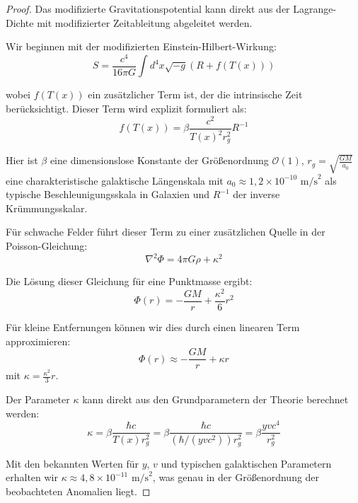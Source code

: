 \documentclass{article}
\theoremstyle{definition}
\theoremstyle{remark}
\newcommand{\Tfield}{T(x)} %
\begin{document}
		\begin{proof}
			Das modifizierte Gravitationspotential kann direkt aus der Lagrange-Dichte mit modifizierter Zeitableitung abgeleitet werden.
			
			Wir beginnen mit der modifizierten Einstein-Hilbert-Wirkung:
			\begin{equation}
				S = \frac{c^4}{16\pi G}\int d^4x \sqrt{-g} \left(R + f(\Tfield) \right)
			\end{equation}
			
			wobei $f(\Tfield)$ ein zusätzlicher Term ist, der die intrinsische Zeit berücksichtigt. Dieser Term wird explizit formuliert als:
			\begin{equation}
				f(\Tfield) = \beta \frac{c^2}{\Tfield^2 r_g^2} R^{-1}
			\end{equation}
			
			Hier ist $\beta$ eine dimensionslose Konstante der Größenordnung $\mathcal{O}(1)$, $r_g = \sqrt{\frac{GM}{a_0}}$ eine charakteristische galaktische Längenskala mit $a_0 \approx 1,2 \times 10^{-10} \text{ m/s}^2$ als typische Beschleunigungsskala in Galaxien und $R^{-1}$ der inverse Krümmungsskalar.
			
			Für schwache Felder führt dieser Term zu einer zusätzlichen Quelle in der Poisson-Gleichung:
			\begin{equation}
				\nabla^2 \Phi = 4\pi G \rho + \kappa^2
			\end{equation}
			
			Die Lösung dieser Gleichung für eine Punktmasse ergibt:
			\begin{equation}
				\Phi(r) = -\frac{GM}{r} + \frac{\kappa^2}{6}r^2
			\end{equation}
			
			Für kleine Entfernungen können wir dies durch einen linearen Term approximieren:
			\begin{equation}
				\Phi(r) \approx -\frac{GM}{r} + \kappa r
			\end{equation}
			mit $\kappa = \frac{\kappa^2}{3}r$.
			
			Der Parameter $\kappa$ kann direkt aus den Grundparametern der Theorie berechnet werden:
			\begin{equation}
				\kappa = \beta \frac{\hbar c}{\Tfield r_g^2} = \beta \frac{\hbar c}{(\hbar/(yvc^2)) r_g^2} = \beta \frac{yvc^4}{r_g^2}
			\end{equation}
			
			Mit den bekannten Werten für $y$, $v$ und typischen galaktischen Parametern erhalten wir $\kappa \approx 4,8 \times 10^{-11} \text{ m/s}^2$, was genau in der Größenordnung der beobachteten Anomalien liegt.
		\end{proof}
		
\end{document}
